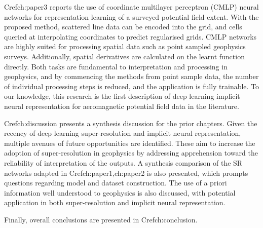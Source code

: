 \documentclass[manuscript.tex]{subfiles}
\begin{document}
Cref{ch:paper3} reports the use of coordinate multilayer perceptron (CMLP) neural networks for representation learning of a surveyed potential field extent.
With the proposed method, scattered line data can be encoded into the grid, and cells queried at interpolating coordinates to predict regularised grids.
CMLP networks are highly suited for processing spatial data such as point sampled geophysics surveys.
Additionally, spatial derivatives are calculated on the learnt function directly.
Both tasks are fundamental to interpretation and processing in geophysics, and by commencing the methods from point sample data, the number of individual processing steps is reduced, and the application is fully trainable.
To our knowledge, this research is the first description of deep learning implicit neural representation for aeromagnetic potential field data in the literature.

Cref{ch:discussion} presents a synthesis discussion for the prior chapters. Given the recency of deep learning super-resolution and implicit neural representation, multiple avenues of future opportunities are identified.
These aim to increase the adoption of super-resolution in geophysics by addressing apprehension toward the reliability of interpretation of the outputs.
A synthesis comparison of the SR networks adapted in Cref{ch:paper1,ch:paper2} is also presented, which prompts questions regarding model and dataset construction.
The use of a priori information well understood to geophysics is also discussed, with potential application in both super-resolution and implicit neural representation.

Finally, overall conclusions are presented in Cref{ch:conclusion}.

\printbibliography{}
\end{document}
